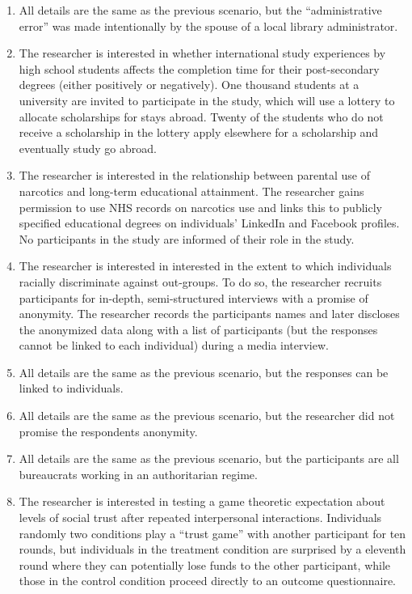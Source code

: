 \documentclass[12pt,a4]{article}
\begin{document}
\begin{enumerate}
\item All details are the same as the previous scenario, but the ``administrative error'' was made intentionally by the spouse of a local library administrator.

\item The researcher is interested in whether international study experiences by high school students affects the completion time for their post-secondary degrees (either positively or negatively). One thousand students at a university are invited to participate in the study, which will use a lottery to allocate scholarships for stays abroad. Twenty of the students who do not receive a scholarship in the lottery apply elsewhere for a scholarship and eventually study go abroad. %

\item The researcher is interested in the relationship between parental use of narcotics and long-term educational attainment. The researcher gains permission to use NHS records on narcotics use and links this to publicly specified educational degrees on individuals' LinkedIn and Facebook profiles. No participants in the study are informed of their role in the study.

\item The researcher is interested in interested in the extent to which individuals racially discriminate against out-groups. To do so, the researcher recruits participants for in-depth, semi-structured interviews with a promise of anonymity. The researcher records the participants names and later discloses the anonymized data along with a list of participants (but the responses cannot be linked to each individual) during a media interview.

\item All details are the same as the previous scenario, but the responses can be linked to individuals.

\item All details are the same as the previous scenario, but the researcher did not promise the respondents anonymity.

\item All details are the same as the previous scenario, but the participants are all bureaucrats working in an authoritarian regime.

\item The researcher is interested in testing a game theoretic expectation about levels of social trust after repeated interpersonal interactions. Individuals randomly two conditions play a ``trust game'' with another participant for ten rounds, but individuals in the treatment condition are surprised by a eleventh round where they can potentially lose funds to the other participant, while those in the control condition proceed directly to an outcome questionnaire. %


\end{enumerate}
\end{document}
